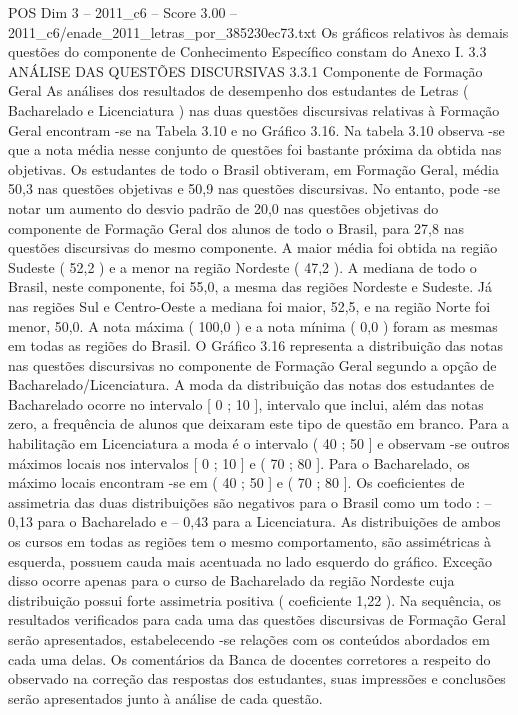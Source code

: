 \begin{textsample}{POS Dim 3 – 2011\_c6 – Score 3.00 – 2011\_c6/enade\_2011\_letras\_por\_385230ec73.txt}
Os gráficos relativos às demais questões do componente de Conhecimento Específico constam do Anexo I. 3.3 ANÁLISE DAS QUESTÕES DISCURSIVAS 3.3.1 Componente de Formação Geral As análises dos resultados de desempenho dos estudantes de Letras ( Bacharelado e Licenciatura ) nas duas questões discursivas relativas à Formação Geral encontram -se na Tabela 3.10 e no Gráfico 3.16.
Na tabela 3.10 observa -se que a nota média nesse conjunto de questões foi bastante próxima da obtida nas objetivas.
Os estudantes de todo o Brasil obtiveram, em Formação Geral, média 50,3 nas questões objetivas e 50,9 nas questões discursivas.
No entanto, pode -se notar um aumento do desvio padrão de 20,0 nas questões objetivas do componente de Formação Geral dos alunos de todo o Brasil, para 27,8 nas questões discursivas do mesmo componente.
A maior média foi obtida na região Sudeste ( 52,2 ) e a menor na região Nordeste ( 47,2 ).
A mediana de todo o Brasil, neste componente, foi 55,0, a mesma das regiões Nordeste e Sudeste.
Já nas regiões Sul e Centro-Oeste a mediana foi maior, 52,5, e na região Norte foi menor, 50,0.
A nota máxima ( 100,0 ) e a nota mínima ( 0,0 ) foram as mesmas em todas as regiões do Brasil.
O Gráfico 3.16 representa a distribuição das notas nas questões discursivas no componente de Formação Geral segundo a opção de Bacharelado/Licenciatura.
A moda da distribuição das notas dos estudantes de Bacharelado ocorre no intervalo [ 0 ; 10 ], intervalo que inclui, além das notas zero, a frequência de alunos que deixaram este tipo de questão em branco.
Para a habilitação em Licenciatura a moda é o intervalo ( 40 ; 50 ] e observam -se outros máximos locais nos intervalos [ 0 ; 10 ] e ( 70 ; 80 ].
Para o Bacharelado, os máximo locais encontram -se em ( 40 ; 50 ] e ( 70 ; 80 ].
Os coeficientes de assimetria das duas distribuições são negativos para o Brasil como um todo : – 0,13 para o Bacharelado e – 0,43 para a Licenciatura.
As distribuições de ambos os cursos em todas as regiões tem o mesmo comportamento, são assimétricas à esquerda, possuem cauda mais acentuada no lado esquerdo do gráfico.
Exceção disso ocorre apenas para o curso de Bacharelado da região Nordeste cuja distribuição possui forte assimetria positiva ( coeficiente 1,22 ).
Na sequência, os resultados verificados para cada uma das questões discursivas de Formação Geral serão apresentados, estabelecendo -se relações com os conteúdos abordados em cada uma delas.
Os comentários da Banca de docentes corretores a respeito do observado na correção das respostas dos estudantes, suas impressões e conclusões serão apresentados junto à análise de cada questão.

\end{textsample}
